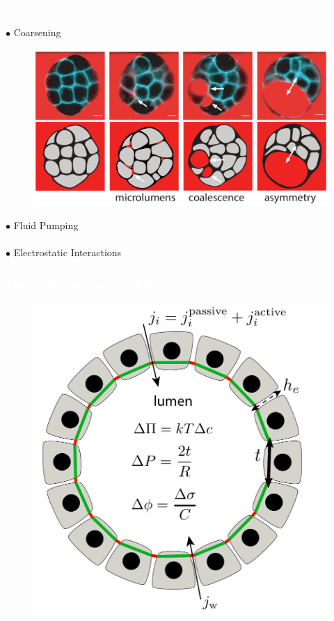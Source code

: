 \documentclass{beamer}
\begin{document}
\begin{frame}{\textcolor{white}{What are the possible mechanisms?}}

\textcolor{blue!50!green!20}{$\bullet$ Coarsening}


\begin{figure}
\includegraphics[scale=0.20]{coarsening.png}
\end{figure}

\textcolor{blue!50!green!20}{$\bullet$ Fluid Pumping}\\
\ 
\\

\textcolor{blue!50!green!20}{$\bullet$ Electrostatic Interactions}




\end{frame}


\begin{frame}
\frametitle{\textcolor{white}{Fluxes of water and solutes}}

\begin{figure}
\centering
\includegraphics[scale=0.2]{tissue_pumping.png}
\end{figure}
\end{frame}
\end{document}
